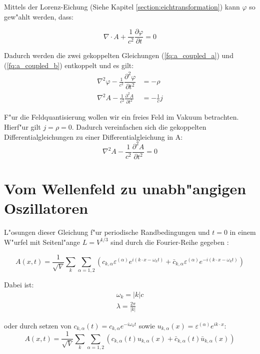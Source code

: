 Mittels der Lorenz-Eichung (Siehe Kapitel \ref{section:eichtransformation}) kann $\varphi$ so gew"ahlt werden, dass:

\begin{equation} \label{fq:lorenz_eq}
\nabla \cdot A + \frac{1}{c^2} \frac{\partial \varphi }{\partial t} = 0
\end{equation}

Dadurch werden die zwei gekoppelten Gleichungen (\ref{fq:a_coupled_a}) und (\ref{fq:a_coupled_b}) entkoppelt und es gilt:
\begin{align*}
\nabla^2 \varphi - \frac{1}{c^2} \dfrac{\partial^2 \varphi}{\partial t^2} &= -\rho \\
\nabla^2 A - \frac{1}{c^2} \frac{\partial^2 A }{\partial t^2} &= - \frac{1}{c} j
\end{align*}

F"ur die Feldquantisierung wollen wir ein freies Feld im Vakuum betrachten. Hierf"ur gilt $j = \rho = 0$.
Dadurch vereinfachen sich die gekoppelten Differentialgleichungen zu einer Differentialgleichung in A:
\begin{equation} \label{fq:wave_dgl}
\nabla^2 A - \frac{1}{c^2} \frac{\partial^2 A }{\partial t^2} = 0
\end{equation}

\section{Vom Wellenfeld zu unabh"angigen Oszillatoren}
L"osungen dieser Gleichung f"ur periodische Randbedingungen und $t=0$ in einem W"urfel mit Seitenl"ange $L = V^{1/3}$ sind durch die Fourier-Reihe gegeben \cite{fq:em_wave_eq}:

\begin{equation} \label{fq:wave_eq}
A(x,t) = \frac{1}{\sqrt{V}} \sum_k \sum_{\alpha=1,2} \left(c_{k,\alpha} \varepsilon^{(\alpha)} e^{i (k \cdot x - \omega_k t)} + \bar{c}_{k,\alpha} \varepsilon^{(\alpha)} e^{-i(k \cdot x - \omega_k t)}\right)
\end{equation}

Dabei ist:
\begin{align*}
\omega_k=|k|c \\
\lambda = \frac{2 \pi}{|k|}
\end{align*}

oder durch setzen von $c_{k,\alpha}(t) = c_{k,\alpha} e^{-i \omega_k t}$ sowie $u_{k,\alpha}(x) = \varepsilon^{(\alpha)} e^{ik \cdot x}$:
\begin{equation*}
A(x,t) = \frac{1}{\sqrt{V}} \sum_k \sum_{\alpha=1,2} \left(c_{k,\alpha}(t)u_{k,\alpha}(x) + \bar{c}_{k,\alpha}(t) \bar{u}_{k,\alpha}(x) \right)
\end{equation*}


